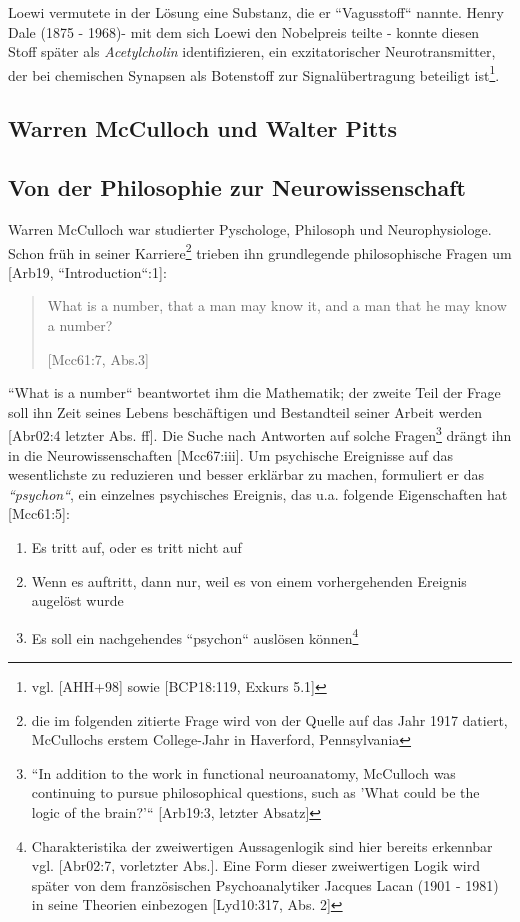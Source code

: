 Loewi vermutete in der Lösung eine Substanz, die er ``Vagusstoff`` nannte.
Henry Dale (1875 - 1968)- mit dem sich Loewi den Nobelpreis teilte - konnte diesen Stoff später als \textit{Acetylcholin} identifizieren, ein exzitatorischer Neurotransmitter, der bei chemischen Synapsen als Botenstoff zur Signalübertragung beteiligt ist\footnote{
    vgl. {[AHH+98]} sowie {[BCP18:119, Exkurs 5.1]}
}.

\subsection{Warren McCulloch und Walter Pitts}\label{appendix:mcculloch}
\subsection*{Von der Philosophie zur Neurowissenschaft}

Warren McCulloch war studierter Pyschologe, Philosoph und Neurophysiologe.
Schon früh in seiner Karriere\footnote{
    die im folgenden zitierte Frage wird von der Quelle auf das Jahr 1917 datiert, McCullochs erstem College-Jahr in Haverford, Pennsylvania
} trieben ihn grundlegende philosophische Fragen um [Arb19, ``Introduction``:1]:

\blockquote[{[Mcc61:7, Abs.3]}]{
    What is a number, that a man may know it, and a man that he may know a number{?}
}

\noindent
``What is a number`` beantwortet ihm die Mathematik; der zweite Teil der Frage soll ihn Zeit seines Lebens beschäftigen und Bestandteil seiner Arbeit werden [Abr02:4 letzter Abs. ff].
Die Suche nach Antworten auf solche Fragen\footnote{
    ``In addition to the work in functional neuroanatomy, McCulloch was continuing to pursue philosophical questions, such as 'What could be the logic of the brain?'`` [Arb19:3, letzter Absatz]
} drängt ihn in die Neurowissenschaften [Mcc67:iii].
Um psychische Ereignisse auf das wesentlichste zu reduzieren und besser erklärbar zu machen, formuliert er das \textit{``psychon``}, ein einzelnes psychisches Ereignis, das u.a. folgende Eigenschaften hat [Mcc61:5]:

\begin{enumerate}
    \item Es tritt auf, oder es tritt nicht auf
    \item Wenn es auftritt, dann nur, weil es von einem vorhergehenden Ereignis augelöst wurde
    \item Es soll ein nachgehendes ``psychon`` auslösen können\footnote{
        Charakteristika der zweiwertigen Aussagenlogik sind hier bereits erkennbar vgl. [Abr02:7, vorletzter Abs.]. Eine Form dieser zweiwertigen Logik wird später von dem französischen Psychoanalytiker Jacques Lacan (1901 - 1981) in seine Theorien einbezogen [Lyd10:317, Abs. 2]
    }
\end{enumerate}


